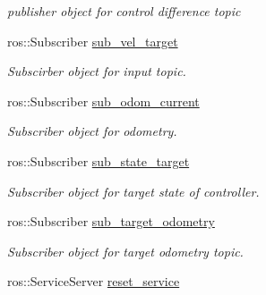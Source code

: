 \begin{DoxyCompactItemize}
\begin{DoxyCompactList}\small\item\em publisher object for control difference topic \end{DoxyCompactList}\item 
ros\+::\+Subscriber \hyperlink{classController_a1ecc749bf5bd484c978940c5a6afe03f}{sub\+\_\+vel\+\_\+target}\hypertarget{classController_a1ecc749bf5bd484c978940c5a6afe03f}{}\label{classController_a1ecc749bf5bd484c978940c5a6afe03f}

\begin{DoxyCompactList}\small\item\em Subscirber object for input topic. \end{DoxyCompactList}\item 
ros\+::\+Subscriber \hyperlink{classController_a855093341ac8afa84efd841654fedaf5}{sub\+\_\+odom\+\_\+current}\hypertarget{classController_a855093341ac8afa84efd841654fedaf5}{}\label{classController_a855093341ac8afa84efd841654fedaf5}

\begin{DoxyCompactList}\small\item\em Subscriber object for odometry. \end{DoxyCompactList}\item 
ros\+::\+Subscriber \hyperlink{classController_adabc3d493b55a60400c74bd4264dbc6e}{sub\+\_\+state\+\_\+target}\hypertarget{classController_adabc3d493b55a60400c74bd4264dbc6e}{}\label{classController_adabc3d493b55a60400c74bd4264dbc6e}

\begin{DoxyCompactList}\small\item\em Subscriber object for target state of controller. \end{DoxyCompactList}\item 
ros\+::\+Subscriber \hyperlink{classController_a7f8a52684719804ecb90c57145513366}{sub\+\_\+target\+\_\+odometry}\hypertarget{classController_a7f8a52684719804ecb90c57145513366}{}\label{classController_a7f8a52684719804ecb90c57145513366}

\begin{DoxyCompactList}\small\item\em Subscriber object for target odometry topic. \end{DoxyCompactList}\item 
ros\+::\+Service\+Server \hyperlink{classController_ae981013bac649b6310e924b6a126bc40}{reset\+\_\+service}\hypertarget{classController_ae981013bac649b6310e924b6a126bc40}{}\label{classController_ae981013bac649b6310e924b6a126bc40}


\end{DoxyCompactItemize}
